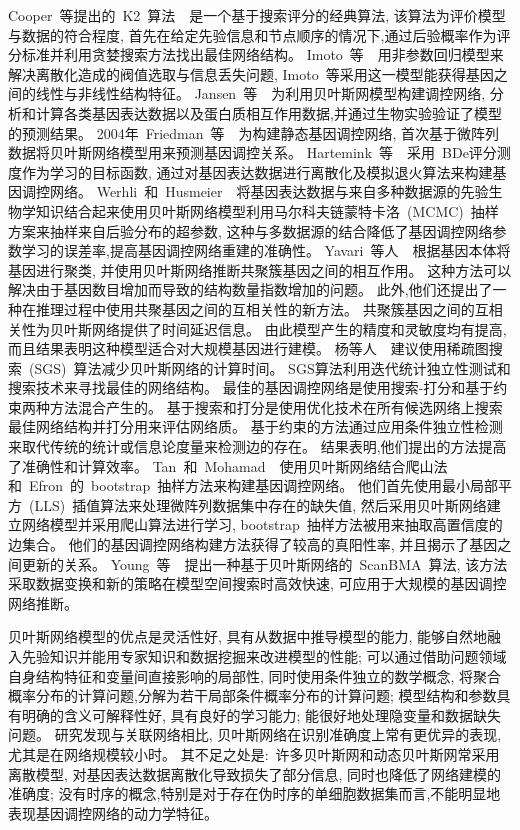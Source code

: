 Cooper~等提出的~K2~算法~\cite{cooper1992bayesian}~是一个基于搜索评分的经典算法,
该算法为评价模型与数据的符合程度,
首先在给定先验信息和节点顺序的情况下,通过后验概率作为评分标准并利用贪婪搜索方法找出最佳网络结构。
Imoto~等~\cite{kim2003inferring}~用非参数回归模型来解决离散化造成的阀值选取与信息丢失问题,
Imoto~等采用这一模型能获得基因之间的线性与非线性结构特征。
Jansen~等~\cite{jansen2003bayesian}~为利用贝叶斯网模型构建调控网络,
分析和计算各类基因表达数据以及蛋白质相互作用数据,并通过生物实验验证了模型的预测结果。
2004年~Friedman~等~\cite{friedman2004inferring}~为构建静态基因调控网络,
首次基于微阵列数据将贝叶斯网络模型用来预测基因调控关系。
Hartemink~等~\cite{hartemink2005reverse}~采用~BDe评分测度作为学习的目标函数,
通过对基因表达数据进行离散化及模拟退火算法来构建基因调控网络。
Werhli~和~Husmeier~\cite{werhli2007reconstructing}~将基因表达数据与来自多种数据源的先验生物学知识结合起来使用贝叶斯网络模型利用马尔科夫链蒙特卡洛~(MCMC)~抽样方案来抽样来自后验分布的超参数,
这种与多数据源的结合降低了基因调控网络参数学习的误差率,提高基因调控网络重建的准确性。
Yavari~等人~\cite{yavari2008gene}~根据基因本体将基因进行聚类,
并使用贝叶斯网络推断共聚簇基因之间的相互作用。
这种方法可以解决由于基因数目增加而导致的结构数量指数增加的问题。 
此外,他们还提出了一种在推理过程中使用共聚基因之间的互相关性的新方法。
共聚簇基因之间的互相关性为贝叶斯网络提供了时间延迟信息。 
由此模型产生的精度和灵敏度均有提高,而且结果表明这种模型适合对大规模基因进行建模。
杨等人~\cite{yang2011bayesian}~建议使用稀疏图搜索~(SGS)~算法减少贝叶斯网络的计算时间。
SGS算法利用迭代统计独立性测试和搜索技术来寻找最佳的网络结构。
最佳的基因调控网络是使用搜索-打分和基于约束两种方法混合产生的。
基于搜索和打分是使用优化技术在所有候选网络上搜索最佳网络结构并打分用来评估网络质。
基于约束的方法通过应用条件独立性检测来取代传统的统计或信息论度量来检测边的存在。
结果表明,他们提出的方法提高了准确性和计算效率。
Tan~和~Mohamad~\cite{kunga2012using}~使用贝叶斯网络结合爬山法和~Efron~的~bootstrap~抽样方法来构建基因调控网络。
他们首先使用最小局部平方~(LLS)~插值算法来处理微阵列数据集中存在的缺失值, 
然后采用贝叶斯网络建立网络模型并采用爬山算法进行学习, 
bootstrap~抽样方法被用来抽取高置信度的边集合。
他们的基因调控网络构建方法获得了较高的真阳性率, 并且揭示了基因之间更新的关系。 
Young~等~\cite{young2014fast}~提出一种基于贝叶斯网络的~ScanBMA~算法,
该方法采取数据变换和新的策略在模型空间搜索时高效快速,
可应用于大规模的基因调控网络推断。

贝叶斯网络模型的优点是灵活性好, 具有从数据中推导模型的能力, 能够自然地融入先验知识并能用专家知识和数据挖掘来改进模型的性能;
可以通过借助问题领域自身结构特征和变量间直接影响的局部性, 同时使用条件独立的数学概念, 将聚合概率分布的计算问题,分解为若干局部条件概率分布的计算问题;
模型结构和参数具有明确的含义可解释性好, 具有良好的学习能力; 能很好地处理隐变量和数据缺失问题。
研究发现与关联网络相比, 贝叶斯网络在识别准确度上常有更优异的表现, 尤其是在网络规模较小时。
其不足之处是:~许多贝叶斯网和动态贝叶斯网常采用离散模型, 对基因表达数据离散化导致损失了部分信息,
同时也降低了网络建模的准确度;
没有时序的概念,特别是对于存在伪时序的单细胞数据集而言,不能明显地表现基因调控网络的动力学特征。

